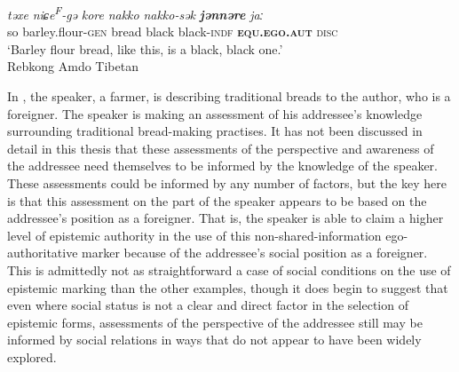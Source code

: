 \begin{exe}
    \ex \label{e:Discussion:AmdoAuth}
    \gll \textit{təxe} \textit{niɕe\textsuperscript{F}-gə} \textit{kore} \textit{nakko} \textit{nakko-sək} \textbf{\textit{jənnəre}} \textit{jaː} \\
    so barley.flour-\textsc{gen} bread black black-\textsc{indf} \textbf{\textsc{equ.ego.aut}} \textsc{disc} \\
    \glt `Barley flour bread, like this, is a black, black one.' \\
    Rebkong Amdo Tibetan \cite[Tibetic:PRC,][300]{Simon2021}
\end{exe}

In , the speaker, a farmer, is describing traditional breads to the author, who is a foreigner. The speaker is making an assessment of his addressee's knowledge surrounding traditional bread-making practises. It has not been discussed in detail in this thesis that these assessments of the perspective and awareness of the addressee need themselves to be informed by the knowledge of the speaker. These assessments could be informed by any number of factors, but the key here is that this assessment on the part of the speaker appears to be based on the addressee's position as a foreigner. That is, the speaker is able to claim a higher level of epistemic authority in the use of this non-shared-information ego-authoritative marker because of the addressee's social position as a foreigner. This is admittedly not as straightforward a case of social conditions on the use of epistemic marking than the other examples, though it does begin to suggest that even where social status is not a clear and direct factor in the selection of epistemic forms, assessments of the perspective of the addressee still may be informed by social relations in ways that do not appear to have been widely explored.


